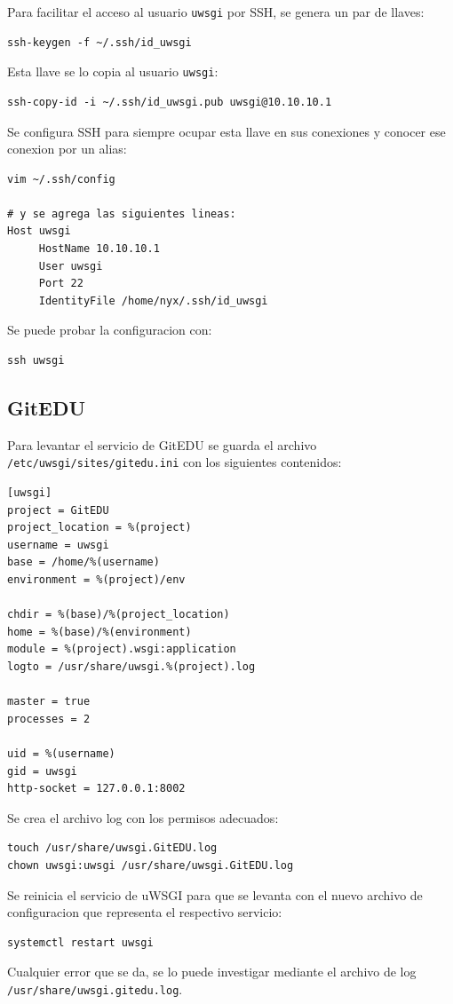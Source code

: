 Para facilitar el acceso al usuario \texttt{uwsgi} por SSH, se genera un par de llaves:
\begin{lstlisting}
ssh-keygen -f ~/.ssh/id_uwsgi
\end{lstlisting}

Esta llave se lo copia al usuario \texttt{uwsgi}:
\begin{lstlisting}
ssh-copy-id -i ~/.ssh/id_uwsgi.pub uwsgi@10.10.10.1
\end{lstlisting}

Se configura SSH para siempre ocupar esta llave en sus conexiones y conocer ese conexion por un alias:
\begin{lstlisting}
vim ~/.ssh/config

# y se agrega las siguientes lineas:
Host uwsgi
     HostName 10.10.10.1
     User uwsgi
     Port 22
     IdentityFile /home/nyx/.ssh/id_uwsgi
\end{lstlisting}

Se puede probar la configuracion con:
\begin{lstlisting}
ssh uwsgi
\end{lstlisting}

\subsection{GitEDU}
Para levantar el servicio de GitEDU se guarda el archivo \\
\texttt{/etc/uwsgi/sites/gitedu.ini} con los siguientes contenidos:
\begin{lstlisting}
[uwsgi]
project = GitEDU
project_location = %(project)
username = uwsgi
base = /home/%(username)
environment = %(project)/env

chdir = %(base)/%(project_location)
home = %(base)/%(environment)
module = %(project).wsgi:application
logto = /usr/share/uwsgi.%(project).log

master = true
processes = 2

uid = %(username)
gid = uwsgi
http-socket = 127.0.0.1:8002
\end{lstlisting}

Se crea el archivo log con los permisos adecuados:
\begin{lstlisting}
touch /usr/share/uwsgi.GitEDU.log
chown uwsgi:uwsgi /usr/share/uwsgi.GitEDU.log
\end{lstlisting}

Se reinicia el servicio de uWSGI para que se levanta con el nuevo archivo de configuracion que representa el respectivo servicio:
\begin{lstlisting}
systemctl restart uwsgi
\end{lstlisting}
Cualquier error que se da, se lo puede investigar mediante el archivo de log \\ \texttt{/usr/share/uwsgi.gitedu.log}.

